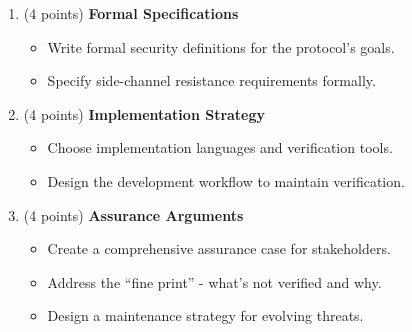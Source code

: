 \documentclass[10pt,a4paper,american]{exam}
\begin{document}
\begin{enumerate}
\begin{enumerate}
		      \item (4 points) \textbf{Formal Specifications}
		            \begin{itemize}
			            \item Write formal security definitions for the protocol's goals.
			            \item Specify side-channel resistance requirements formally.
		            \end{itemize}

		      \item (4 points) \textbf{Implementation Strategy}
		            \begin{itemize}
			            \item Choose implementation languages and verification tools.
			            \item Design the development workflow to maintain verification.
		            \end{itemize}

		      \item (4 points) \textbf{Assurance Arguments}
		            \begin{itemize}
			            \item Create a comprehensive assurance case for stakeholders.
			            \item Address the ``fine print'' - what's not verified and why.
			            \item Design a maintenance strategy for evolving threats.
		            \end{itemize}
	      \end{enumerate}
\end{enumerate}
\end{document}
